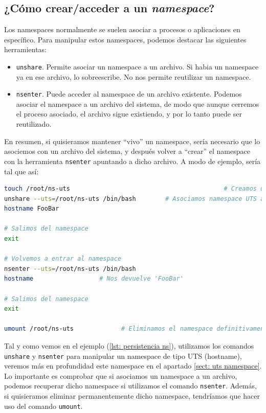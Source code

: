 \documentclass[12pt]{article}
\begin{document}
	\subsection{¿Cómo crear/acceder a un \textit{namespace}?}
	\noindent Los namespaces normalmente se suelen asociar a procesos o aplicaciones en específico. Para manipular estos namespaces, podemos destacar las siguientes herramientas: 
	\begin{itemize}
		\item \texttt{unshare}. Permite asociar un namespace a un archivo. Si habia un namespace ya en ese archivo, lo sobreescribe. No nos permite reutilizar un namespace.
		\item \texttt{nsenter}. Puede acceder al namespace de un archivo existente. Podemos asociar el namespace a un archivo del sistema, de modo que aunque cerremos el proceso asociado, el archivo sigue existiendo, y por lo tanto puede ser reutilizado.
	\end{itemize}

	\noindent En resumen, si quisieramos mantener ``vivo'' un namespace, sería necesario que lo asociemos con un archivo del sistema, y después volver a ``crear'' el namespace con la herramienta \texttt{nsenter} apuntando a dicho archivo. A modo de ejemplo, sería tal que así:
	
	\begin{lstlisting}[language=Bash, label=lst: persistencia ns, caption=Ejemplo de un persistencia namespace]
touch /root/ns-uts											# Creamos un archivo
unshare --uts=/root/ns-uts /bin/bash		# Asociamos namespace UTS al archivo
hostname FooBar

# Salimos del namespace
exit

# Volvemos a entrar al namespace
nsenter --uts=/root/ns-uts /bin/bash
hostname                  # Nos devuelve 'FooBar'

# Salimos del namespace
exit

umount /root/ns-uts 			# Eliminamos el namespace definitivamente
	\end{lstlisting}
	
	\vspace{10px}
	
	\noindent Tal y como vemos en el ejemplo (\ref{lst: persistencia ns}), utilizamos los comandos \texttt{unshare} y \texttt{nsenter} para manipular un namespace de tipo UTS (hostname), veremos más en profundidad este namespace en el apartado \ref{sect: uts namespace}. Lo importante es comprobar que si asociamos un namespace a un archivo, podemos recuperar dicho namespace si utilizamos el comando \texttt{nsenter}. Además, si quisieramos eliminar permanentemente dicho namespace, tendríamos que hacer uso del comando \texttt{umount}.
	
\end{document}
